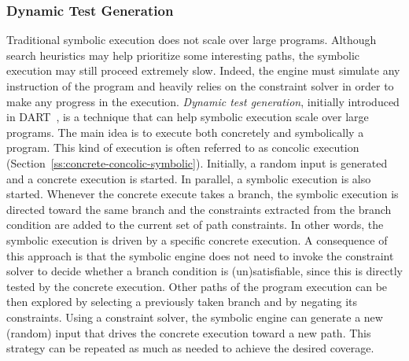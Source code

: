 \subsubsection{Dynamic Test Generation}
Traditional symbolic execution does not scale over large programs. Although search heuristics may help prioritize some interesting paths, the symbolic execution may still proceed extremely slow. Indeed, the engine must simulate any instruction of the program and heavily relies on the constraint solver in order to make any progress in the execution. {\em Dynamic test generation}, initially introduced in {\sc DART}~\cite{DART-PLDI05}, is a technique that can help symbolic execution scale over large programs. The main idea is to execute both concretely and symbolically a program. This kind of execution is often referred to as concolic execution (Section~\ref{ss:concrete-concolic-symbolic}). Initially, a random input is generated and a concrete execution is started. In parallel, a symbolic execution is also started. Whenever the concrete execute takes a branch, the symbolic execution is directed toward the same branch and the constraints extracted from the branch condition are added to the current set of path constraints. In other words, the symbolic execution is driven by a specific concrete execution. A consequence of this approach is that the symbolic engine does not need to invoke the constraint solver to decide whether a branch condition is (un)satisfiable, since this is directly tested by the concrete execution. Other paths of the program execution can be then explored by selecting a previously taken branch and by negating its constraints. Using a constraint solver, the symbolic engine can generate a new (random) input that drives the concrete execution toward a new path. This strategy can be repeated as much as needed to achieve the desired coverage.

